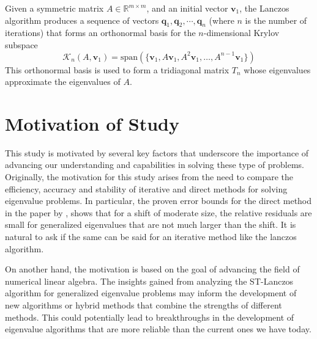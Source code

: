 Given a symmetric matrix $A \in \mathbb{R}^{m\times m}$, and an initial vector $\mathbf{v}_1$, the Lanczos algorithm produces a sequence of vectors $\mathbf{q}_1, \mathbf{q}_2, \cdots, \mathbf{q}_n$ (where $n$ is the number of iterations) that forms an orthonormal basis for the $n$-dimensional Krylov subspace
\begin{equation}\label{eq:KrylovSubspaceDefinition}
       \mathcal{K}_n(A, \mathbf{v}_1) = \text{span}(\{\mathbf{v}_1, A\mathbf{v}_1, A^2\mathbf{v}_1, \ldots, A^{n-1}\mathbf{v}_1\})
\end{equation}
This orthonormal basis is used to form a tridiagonal matrix $T_n$ whose eigenvalues approximate the eigenvalues of $A$.

\section{Motivation of Study}\label{sec:MotivationOfStudy}

This study is motivated by several key factors that underscore the importance of advancing our understanding and capabilities in solving these type of problems. Originally, the motivation for this study arises from the need to compare the efficiency, accuracy and stability of iterative and direct methods for solving eigenvalue problems. In particular, the proven error bounds for the direct method in the paper by \cite{stewart2024spectraltransformationdensesymmetric}, shows that for a shift of moderate size, the relative residuals are small for generalized eigenvalues that are not much larger than the shift. It is natural to ask if the same can be said for an iterative method like the lanczos algorithm.

On another hand, the motivation is based on the goal of advancing the field of numerical linear algebra. The insights gained from analyzing the ST-Lanczos algorithm for generalized eigenvalue problems may inform the development of new algorithms or hybrid methods that combine the strengths of different methods. This could potentially lead to breakthroughs in the development of eigenvalue algorithms that are more reliable than the current ones we have today.


